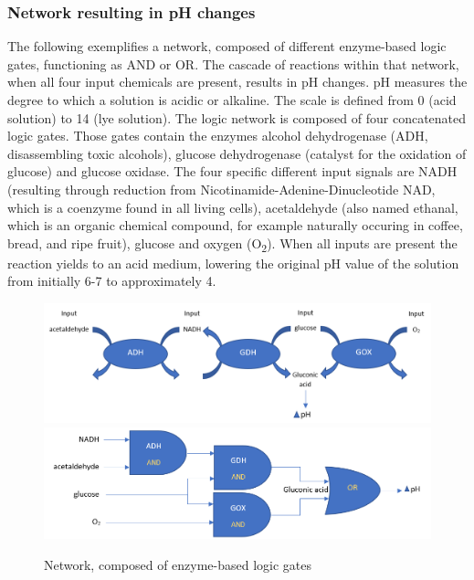 \documentclass[runningheads]{llncs}
\begin{document}
		\subsubsection{Network resulting in pH changes} The following exemplifies a network, composed of different enzyme-based logic gates, functioning as AND or OR. The cascade of reactions within that network, when all four input chemicals are present, results in pH changes. pH measures the degree to which a solution is acidic or alkaline. The scale is defined from 0 (acid solution) to 14 (lye solution)\cite{chemie2}. The logic network is composed of four concatenated logic gates. Those gates contain the enzymes alcohol dehydrogenase (ADH, disassembling toxic alcohols), glucose dehydrogenase (catalyst for the oxidation of glucose) and glucose oxidase\cite{chemie2}. The four specific different input signals are NADH (resulting through reduction from Nicotinamide-Adenine-Dinucleotide NAD, which is a coenzyme found in all living cells),  acetaldehyde (also named ethanal, which is an organic chemical compound, for example naturally occuring in coffee, bread, and ripe fruit), glucose and oxygen (O\textsubscript{2})\cite{chemie2}.
	 	When all inputs are present the reaction yields to an acid medium, lowering the original pH value of the solution from initially 6-7 to approximately 4. \cite{original}\cite{chemie}

		
		\begin{figure}
			\centering \includegraphics[scale= 0.35]{pics/network1.png}
			\includegraphics[scale = 0.39]{pics/network2.png} \caption{Network, composed of enzyme-based logic gates} 
		\end{figure}		
		
\end{document}
